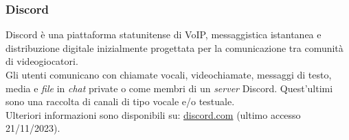 \subsubsection*{Discord}
Discord è una piattaforma statunitense di VoIP, messaggistica istantanea e
distribuzione digitale inizialmente progettata per la comunicazione tra comunità
di videogiocatori.\\
Gli utenti comunicano con chiamate vocali, videochiamate, messaggi di testo,
media e \textit{file} in \textit{chat} private o come membri di un \textit{server}
Discord. Quest'ultimi sono una raccolta di canali di tipo vocale e/o testuale.\\
Ulteriori informazioni sono disponibili su:
\href{https://discord.com/}{discord.com} (ultimo accesso 21/11/2023).

\newpage
